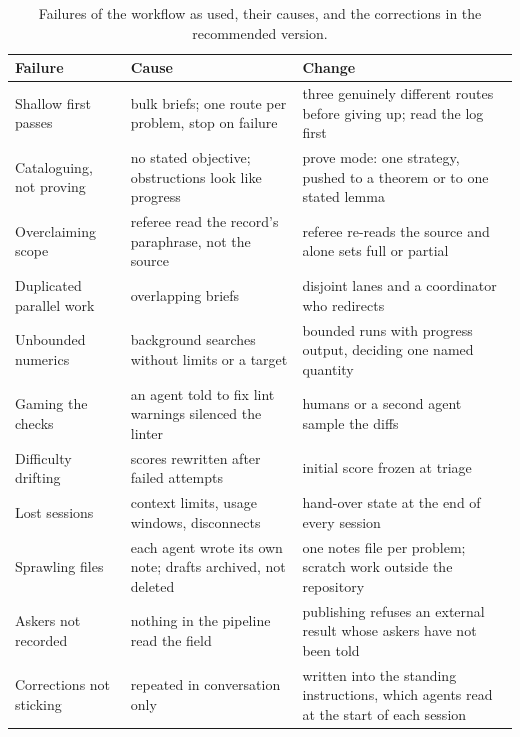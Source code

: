 \documentclass[11pt]{amsart}
\begin{document}
\begin{table}[ht]
  \centering
  \small
  \begin{tabular}{p{}p{}p{}}
    \toprule
    Failure                  & Cause                                                       & Change                                                                                 \\
    \midrule
    Shallow first passes     & bulk briefs; one route per problem, stop on failure         & three genuinely different routes before giving up; read the log first                  \\
    Cataloguing, not proving & no stated objective; obstructions look like progress        & prove mode: one strategy, pushed to a theorem or to one stated lemma                   \\
    Overclaiming scope       & referee read the record's paraphrase, not the source        & referee re-reads the source and alone sets full or partial                             \\
    Duplicated parallel work & overlapping briefs                                          & disjoint lanes and a coordinator who redirects                                         \\
    Unbounded numerics       & background searches without limits or a target              & bounded runs with progress output, deciding one named quantity                         \\
    Gaming the checks        & an agent told to fix lint warnings silenced the linter      & humans or a second agent sample the diffs                                              \\
    Difficulty drifting      & scores rewritten after failed attempts                      & initial score frozen at triage                                                         \\
    Lost sessions            & context limits, usage windows, disconnects                  & hand-over state at the end of every session                                            \\
    Sprawling files          & each agent wrote its own note; drafts archived, not deleted & one notes file per problem; scratch work outside the repository                        \\
    Askers not recorded      & nothing in the pipeline read the field                      & publishing refuses an external result whose askers have not been told                  \\
    Corrections not sticking & repeated in conversation only                               & written into the standing instructions, which agents read at the start of each session \\
    \bottomrule
  \end{tabular}
  \caption{Failures of the workflow as used, their causes, and the
    corrections in the recommended version.}\label{tab:failures}
\end{table}
\end{document}
